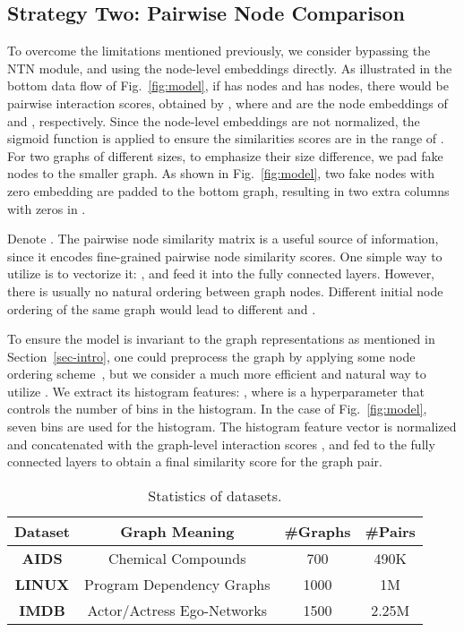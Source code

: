 \documentclass[sigconf]{acmart}
\begin{document}
\subsection{Strategy Two: Pairwise Node Comparison}
\label{subsec-pnc}
To overcome the limitations mentioned previously, we consider bypassing the NTN module, and using the node-level embeddings directly. As illustrated in the bottom data flow of Fig.~\ref{fig:model}, if  has  nodes and  has  nodes, there would be  pairwise interaction scores, obtained by , where  and  are the node embeddings of  and , respectively. Since the node-level embeddings are not normalized, the sigmoid function is applied to ensure the similarities scores are in the range of . For two graphs of different sizes, to emphasize their size difference, we pad fake nodes to the smaller graph. As shown in Fig.~\ref{fig:model}, two fake nodes with zero embedding are padded to the bottom graph, resulting in two extra columns with zeros in .

Denote . The pairwise node similarity matrix  is a useful source of information, since it encodes fine-grained pairwise node similarity scores. One simple way to utilize  is to vectorize it: , and feed it into the fully connected layers. However, there is usually no natural ordering between graph nodes. Different initial node ordering of the same graph would lead to different  and .

To ensure the model is invariant to the graph representations as mentioned in Section~\ref{sec-intro}, one could preprocess the graph by applying some node ordering scheme~\cite{niepert2016learning}, but we consider a much more efficient and natural way to utilize . We extract its histogram features: , where  is a hyperparameter that controls the number of bins in the histogram. In the case of Fig.~\ref{fig:model}, seven bins are used for the histogram. The histogram feature vector is normalized and concatenated with the graph-level interaction scores , and fed to the fully connected layers to obtain a final similarity score for the graph pair.

\begin{table}
\caption{Statistics of datasets.}
\small
\begin{tabular}
{|c|ccc|} \hline
\textbf{Dataset} & \textbf{Graph Meaning} & \textbf{\#Graphs} & \textbf{\#Pairs} \\ \hline
\textbf{AIDS} & {Chemical Compounds} & 700 & 490K \\ \hline
\textbf{LINUX} & {Program Dependency Graphs} & 1000 & 1M  \\ \hline
\textbf{IMDB} & {Actor/Actress Ego-Networks} & 1500 & 2.25M\\ \hline
\end{tabular}
\centering
\label{dataset_summary}
\vspace*{-4mm}
\end{table}
\end{document}
